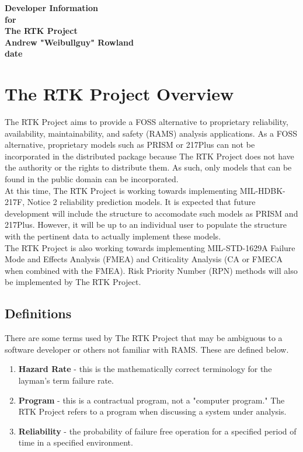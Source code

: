 \documentclass[11pt, 12pt, twoside, onecolumn]{article}
\begin{document}
\begin{titlepage}
\centering
{\Large \bf Developer Information} \\
{\Large \bf for} \\
{\Large \bf The RTK Project} \\
\bigskip
{\large \bf Andrew "Weibullguy" Rowland} \\
{\Large \bf date}
\end{titlepage}
\linespread{1}

\tableofcontents
\newpage

\section{\bf \Large The RTK Project Overview}

\noindent The RTK Project aims to provide a FOSS alternative to proprietary reliability, availability, maintainability, and safety (RAMS) analysis applications.  As a FOSS alternative, proprietary models such as PRISM or 217Plus can not be incorporated in the distributed package because The RTK Project does not have the authority or the rights to distribute them.  As such, only models that can be found in the public domain can be incorporated. \\

\noindent At this time, The RTK Project is working towards implementing MIL-HDBK-217F, Notice 2 reliability prediction models.  It is expected that future development will include the structure to accomodate such models as PRISM and 217Plus.  However, it will be up to an individual user to populate the structure with the pertinent data to actually implement these models. \\

\noindent The RTK Project is also working towards implementing MIL-STD-1629A Failure Mode and Effects Analysis (FMEA) and Criticality Analysis (CA or FMECA when combined with the FMEA).  Risk Priority Number (RPN) methods will also be implemented by The RTK Project. \\

\subsection{\bf \large Definitions}

\noindent There are some terms used by The RTK Project that may be ambiguous to a software developer or others not familiar with RAMS.  These are defined below.

\begin{enumerate}
    \item \textbf{Hazard Rate} - this is the mathematically correct terminology for the layman's term failure rate.
    \item \textbf{Program} - this is a contractual program, not a "computer program."  The RTK Project refers to a program when discussing a system under analysis.
    \item \textbf{Reliability} - the probability of failure free operation for a specified period of time in a specified environment.
\end{enumerate}
\end{document}
